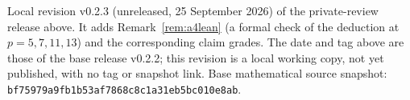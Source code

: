 \par\noindent\small Local revision v0.2.3 (unreleased, 25 September 2026) of the private-review release above. It adds Remark~\ref{rem:a4lean} (a formal check of the deduction at $p=5,7,11,13$) and the corresponding claim grades. The date and tag above are those of the base release v0.2.2; this revision is a local working copy, not yet published, with no tag or snapshot link. Base mathematical source snapshot: \nolinkurl{bf75979a9fb1b53af7868c8c1a31eb5bc010e8ab}.\normalsize
